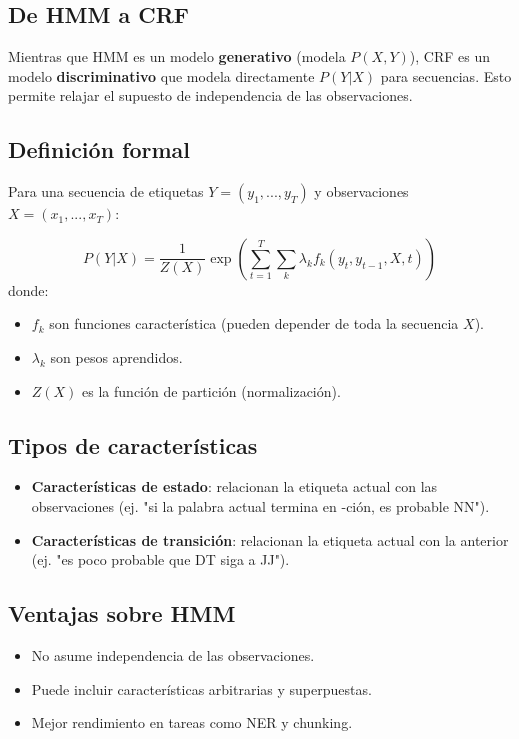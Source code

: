 \documentclass[12pt,a4paper,openany,oneside]{book}
\begin{document}
\subsection{De HMM a CRF}
Mientras que HMM es un modelo \textbf{generativo} (modela \(P(X,Y)\)), CRF es un modelo \textbf{discriminativo} que modela directamente \(P(Y|X)\) para secuencias. Esto permite relajar el supuesto de independencia de las observaciones.

\subsection{Definición formal}
Para una secuencia de etiquetas \(Y = (y_1, ..., y_T)\) y observaciones \(X = (x_1, ..., x_T)\):

\[
P(Y|X) = \frac{1}{Z(X)} \exp\left(\sum_{t=1}^T \sum_k \lambda_k f_k(y_t, y_{t-1}, X, t)\right)
\]
donde:
\begin{itemize}
    \item \(f_k\) son funciones característica (pueden depender de toda la secuencia \(X\)).
    \item \(\lambda_k\) son pesos aprendidos.
    \item \(Z(X)\) es la función de partición (normalización).
\end{itemize}

\subsection{Tipos de características}
\begin{itemize}
    \item \textbf{Características de estado}: relacionan la etiqueta actual con las observaciones (ej. "si la palabra actual termina en -ción, es probable NN").
    \item \textbf{Características de transición}: relacionan la etiqueta actual con la anterior (ej. "es poco probable que DT siga a JJ").
\end{itemize}

\subsection{Ventajas sobre HMM}
\begin{itemize}
    \item No asume independencia de las observaciones.
    \item Puede incluir características arbitrarias y superpuestas.
    \item Mejor rendimiento en tareas como NER y chunking.
\end{itemize}
\end{document}
